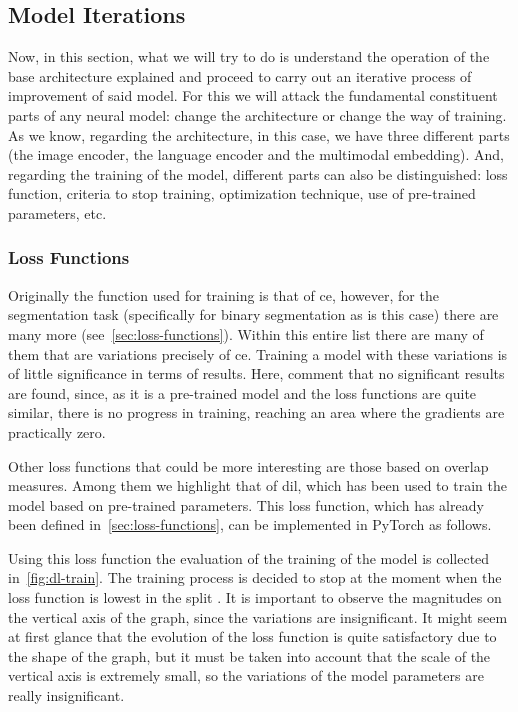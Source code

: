 \subsection{Model Iterations}\label{sec:model-iterations}

Now, in this section, what we will try to do is understand the operation of the
base architecture explained and proceed to carry out an iterative process of
improvement of said model. For this we will attack the fundamental constituent
parts of any neural model: change the architecture or change the way of
training. As we know, regarding the architecture, in this case, we have three
different parts (the image encoder, the language encoder and the multimodal
embedding). And, regarding the training of the model, different parts can also
be distinguished: loss function, criteria to stop training, optimization
technique, use of pre-trained parameters, etc.

\subsubsection{Loss Functions}

Originally the function used for training is that of \gls{ce}, however, for the
segmentation task (specifically for binary segmentation as is this case) there
are many more (see\ \vref{sec:loss-functions}). Within this entire list there
are many of them that are variations precisely of \gls{ce}. Training a model
with these variations is of little significance in terms of results. Here,
comment that no significant results are found, since, as it is a pre-trained
model and the loss functions are quite similar, there is no progress in
training, reaching an area where the gradients are practically zero.

Other loss functions that could be more interesting are those based on overlap
measures. Among them we highlight that of \gls{dil}, which has been used to
train the model based on pre-trained parameters. This loss function, which has
already been defined in\ \vref{sec:loss-functions}, can be implemented in
PyTorch as follows.


Using this loss function the evaluation of the training of the model is
collected in\ \vref{fig:dl-train}. The training process is decided to stop at
the moment when the loss function is lowest in the split . It is
important to observe the magnitudes on the vertical axis of the graph, since
the variations are insignificant. It might seem at first glance that the
evolution of the loss function is quite satisfactory due to the shape of the
graph, but it must be taken into account that the scale of the vertical axis is
extremely small, so the variations of the model parameters are really
insignificant.


